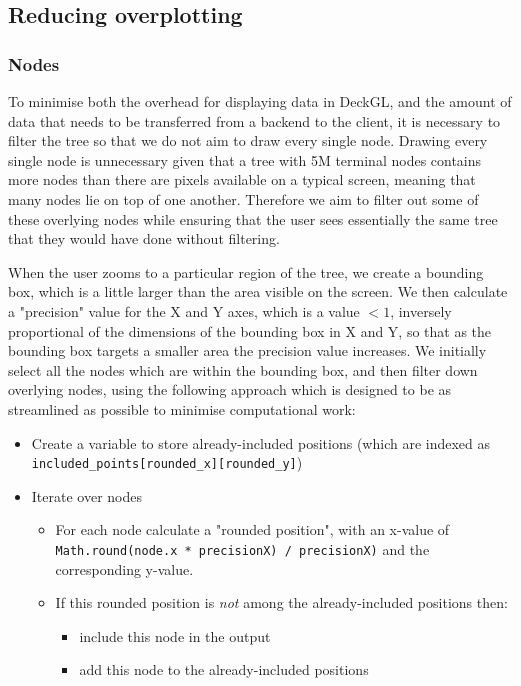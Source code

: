 \documentclass[twocolumn]{bioRxiv}
\providecommand{\DIFadd}[1]{{\protect\color{teal}#1}}
\providecommand{\DIFaddbegin}{}
\providecommand{\DIFaddend}{}
\begin{document}
\subsection*{\DIFadd{Reducing overplotting}}
\subsubsection*{\DIFadd{Nodes}}

\DIFadd{To minimise both the overhead for displaying data in DeckGL, and the amount of data that needs to be transferred from a backend to the client, it is necessary to filter the tree so that we do not aim to draw every single node. Drawing every single node is unnecessary given that a tree with 5M terminal nodes contains more nodes than there are pixels available on a typical screen, meaning that many nodes lie on top of one another. Therefore we aim to filter out some of these overlying nodes while ensuring that the user sees essentially the same tree that they would have done without filtering.
}

\DIFadd{When the user zooms to a particular region of the tree, we create a bounding box, which is a little larger than the area visible on the screen. We then calculate a "precision" value for the X and Y axes, which is a value $<1$, inversely proportional of the dimensions of the bounding box in X and Y, so that as the bounding box targets a smaller area the precision value increases. We initially select all the nodes which are within the bounding box, and then filter down overlying nodes, using the following approach which is designed to be as streamlined as possible to minimise computational work:
}

\begin{itemize}
 \item \DIFadd{Create a variable to store already-included  positions (which are indexed as}\\ \texttt{\DIFadd{included\_points}[\DIFadd{rounded\_x}][\DIFadd{rounded\_y}]}\DIFadd{)
    }\item \DIFadd{Iterate over nodes
    }\begin{itemize}
    \item \DIFadd{For each node calculate a "rounded position", with an x-value of }\texttt{\DIFadd{Math.round(node.x * precisionX) / precisionX)}} \DIFadd{and the corresponding y-value}\DIFaddend .
    \DIFaddbegin \item \DIFadd{If this rounded position is }\textit{\DIFadd{not}} \DIFadd{among the already-included positions then:
    }\begin{itemize}
    \item \DIFadd{include this node in the output
    }\item \DIFadd{add this node to the already-included positions
    }

    
    \end{itemize}

    \end{itemize}
\end{itemize}
\end{document}
